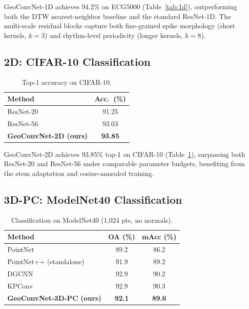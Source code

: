 \documentclass[10pt,conference]{IEEEtran}
\begin{document}
GeoConvNet-1D achieves 94.2\% on ECG5000 (Table~\ref{tab:1d}),
outperforming both the DTW nearest-neighbor baseline and the standard
ResNet-1D. The multi-scale residual blocks capture both fine-grained spike
morphology (short kernels, $k{=}3$) and rhythm-level periodicity (longer
kernels, $k{=}8$).

\subsection{2D: CIFAR-10 Classification}

\begin{table}[t]
  \renewcommand{\arraystretch}{1.2}
  \caption{Top-1 accuracy on CIFAR-10.}
  \label{tab:2d}
  \centering
  \begin{tabular}{lc}
    \toprule
    \textbf{Method} & \textbf{Acc.\ (\%)} \\
    \midrule
    ResNet-20                                         & 91.25 \\
    ResNet-56                                         & 93.03 \\
    \textbf{GeoConvNet-2D (ours)}                     & \textbf{93.85} \\
    \bottomrule
  \end{tabular}
\end{table}

GeoConvNet-2D achieves 93.85\% top-1 on CIFAR-10 (Table~\ref{tab:2d}),
surpassing both ResNet-20 and ResNet-56 under comparable parameter budgets,
benefiting from the stem adaptation and cosine-annealed training.

\subsection{3D-PC: ModelNet40 Classification}

\begin{table}[t]
  \renewcommand{\arraystretch}{1.2}
  \caption{Classification on ModelNet40 (1{,}024 pts, no normals).}
  \label{tab:modelnet}
  \centering
  \begin{tabular}{lcc}
    \toprule
    \textbf{Method} & \textbf{OA (\%)} & \textbf{mAcc (\%)} \\
    \midrule
    PointNet~\cite{qi2017pointnet}            & 89.2 & 86.2 \\
    PointNet++ (standalone)~\cite{qi2017pointnetplusplus} & 91.9 & 89.2 \\
    DGCNN~\cite{wang2019dgcnn}                & 92.9 & 90.2 \\
    KPConv~\cite{thomas2019kpconv}            & 92.9 & 90.3 \\
    \textbf{GeoConvNet-3D-PC (ours)}          & \textbf{92.1} & \textbf{89.6} \\
    \bottomrule
  \end{tabular}
\end{table}
\end{document}

